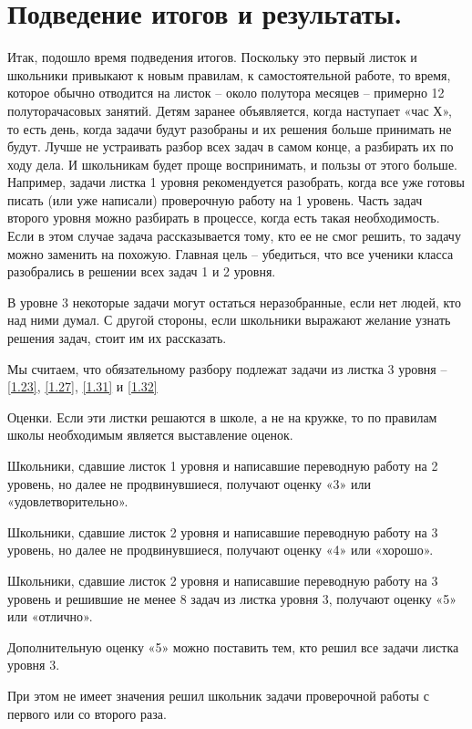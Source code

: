 \section{Подведение итогов  и результаты.}

 Итак, подошло время подведения итогов. Поскольку это первый листок и школьники привыкают к новым правилам, к самостоятельной работе, то время, которое обычно отводится на листок -- около полутора месяцев -- примерно 12 полуторачасовых занятий. Детям заранее объявляется, когда наступает «час Х», то есть день, когда задачи будут разобраны и их решения больше принимать не будут. Лучше не устраивать разбор всех задач в самом конце, а разбирать их по ходу дела. И школьникам будет проще воспринимать, и пользы от этого больше. Например, задачи листка 1 уровня рекомендуется разобрать, когда все уже готовы писать (или уже написали) проверочную работу на 1 уровень. Часть задач второго уровня можно разбирать в процессе, когда есть такая необходимость. Если в этом случае задача рассказывается тому, кто ее не смог решить, то задачу можно заменить на похожую. Главная цель -- убедиться, что все ученики класса разобрались в решении всех задач 1 и 2 уровня.

 В уровне 3 некоторые задачи могут остаться неразобранные, если нет людей, кто над ними думал. С другой стороны, если школьники выражают желание узнать решения задач, стоит им их рассказать. 

 Мы считаем, что обязательному разбору подлежат задачи из листка 3 уровня -- \ref{1.23}, \ref{1.27}, \ref{1.31} и \ref{1.32}

 Оценки. Если эти листки решаются в школе, а не на кружке, то по правилам школы необходимым является выставление оценок. 

 Школьники, сдавшие листок 1 уровня и написавшие переводную работу на 2 уровень, но далее не продвинувшиеся, получают оценку «3» или «удовлетворительно».

 Школьники, сдавшие листок 2 уровня и написавшие переводную работу на 3 уровень, но далее не продвинувшиеся, получают оценку «4» или «хорошо».

 Школьники, сдавшие листок 2 уровня и написавшие переводную работу на 3 уровень и решившие не менее 8 задач из листка уровня 3, получают оценку «5» или «отлично». 

 Дополнительную оценку «5» можно поставить тем, кто решил все задачи листка уровня 3.

 При этом не имеет значения решил школьник задачи проверочной работы с первого или со второго раза.


